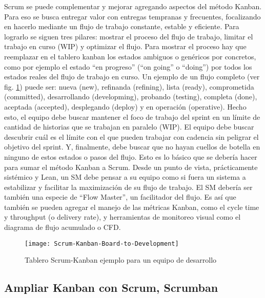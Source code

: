 Scrum se puede complementar y mejorar agregando aspectos del método Kanban. Para eso se busca entregar valor con entregas tempranas y frecuentes, focalizando en hacerlo mediante un flujo de trabajo constante, estable y eficiente. Para lograrlo se siguen tres pilares: mostrar el proceso del flujo de trabajo, limitar el trabajo en curso (WIP) y optimizar el flujo. Para mostrar el proceso hay que reemplazar en el tablero kanban los estados ambiguos o genéricos por concretos, como por ejemplo el estado “en progreso” (“on going” o “doing”) por todos los estados reales del flujo de trabajo en curso.  Un ejemplo de un flujo completo (ver fig. \ref{fig:Scrum-Kanban-Board-to-Development}) puede ser: nueva (new), refinanda (refining), lista (ready), comprometida (committed), desarrollando (developming), probando (testing), completa (done), aceptada (accepted), desplegando (deploy) y en operación (operative). Hecho esto, el equipo debe buscar mantener el foco de trabajo del sprint en un límite de cantidad de historias que se trabajan en paralelo (WIP). El equipo debe buscar descubrir cuál es el límite con el que pueden trabajar con cadencia sin peligrar el objetivo del sprint. Y, finalmente, debe buscar que no hayan cuellos de botella en ninguno de estos estados o pasos del flujo. Esto es lo básico que se debería hacer para sumar el método Kanban a Scrum. Desde un punto de vista, prácticamente sistémico y Lean, un SM debe pensar a su equipo como si fuera un sistema a estabilizar y facilitar la maximización de su flujo de trabajo. El SM debería ser también una especie de “Flow Master”, un facilitador del flujo. Es así que también se pueden agregar el manejo de las métricas Kanban, como el cycle time y throughput (o delivery rate), y herramientas de monitoreo visual como el diagrama de flujo acumulado o CFD.

\begin{figure}[h]
  \centering
  \texttt{[image: Scrum-Kanban-Board-to-Development]}
  \caption{Tablero Scrum-Kanban ejemplo para un equipo de desarrollo}
  \centering
  \label{fig:Scrum-Kanban-Board-to-Development} %
\end{figure}
\FloatBarrier %

\subsection{Ampliar Kanban con Scrum, Scrumban}

